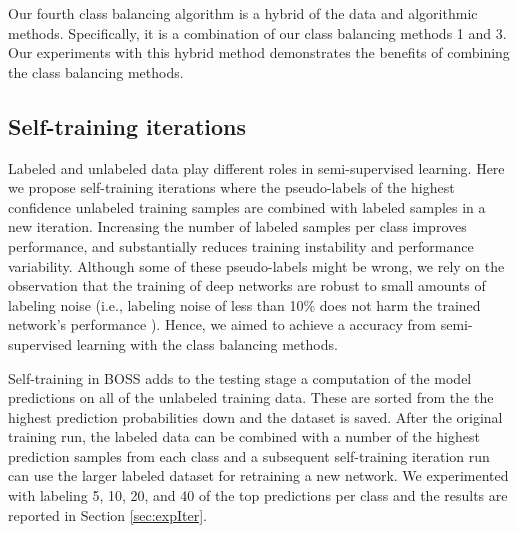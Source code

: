 \documentclass[final]{cvpr}
\newcommand{\SSL}{semi-supervised learning }
\newcommand{\SSLno}{semi-supervised learning}
\begin{document}
Our fourth class balancing algorithm is a hybrid of the data and algorithmic methods.  Specifically, it is a  combination of our class balancing methods 1 and 3.  Our experiments with this hybrid method demonstrates the benefits of combining the class balancing methods.

\subsection{Self-training iterations}
\label{sec:iter}

Labeled and unlabeled data play different roles in \SSLno.  
Here we propose self-training iterations where the pseudo-labels of the highest confidence unlabeled training samples are combined with labeled samples in a new iteration.
Increasing the number of labeled samples per class improves performance, and substantially reduces training instability and performance variability.
Although some of these pseudo-labels might be wrong, we rely on the observation that the training of deep networks are robust to small amounts of labeling noise (i.e., labeling noise of less than 10\% does not harm the trained network's performance \cite{algan2019image}).
Hence, we aimed to achieve a  accuracy from \SSL with the class balancing methods.

Self-training in BOSS adds to the testing stage a computation of the model predictions on all of the unlabeled training data.  
These are sorted from the the highest prediction probabilities down and the dataset is saved.
After the original training run, the labeled data can be combined with a number of the highest prediction samples from each class and a subsequent self-training iteration run can use the larger labeled dataset for retraining a new network.
We experimented with labeling 5, 10, 20, and 40 of the top predictions per class and the results are reported in Section \ref{sec:expIter}.
\end{document}
